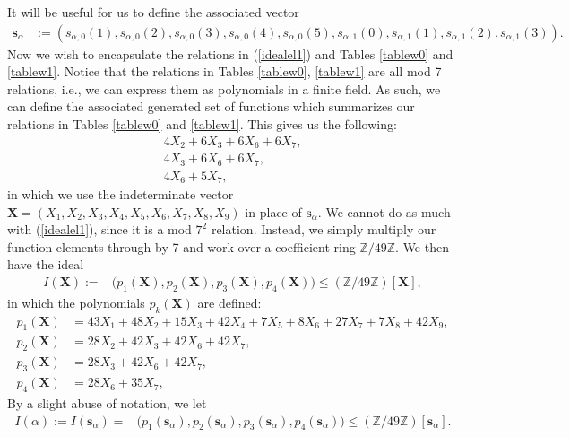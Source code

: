 \documentclass[reqno]{amsart}
\theoremstyle{definition}
\theoremstyle{remark}
\numberwithin{equation}{section}
\begin{document}
It will be useful for us to define the associated vector
\begin{align}
\mathbf{s}_{\alpha} &:= \left( s_{\alpha,0}(1), s_{\alpha,0}(2), s_{\alpha,0}(3), s_{\alpha,0}(4), s_{\alpha,0}(5), s_{\alpha,1}(0), s_{\alpha,1}(1), s_{\alpha,1}(2), s_{\alpha,1}(3) \right).\label{salphavector}
\end{align}  Now we wish to encapsulate the relations in (\ref{idealel1}) and Tables \ref{tablew0} and \ref{tablew1}.  Notice that the relations in Tables \ref{tablew0}, \ref{tablew1} are all mod 7 relations, i.e., we can express them as polynomials in a finite field.  As such, we can define the associated generated set of functions which summarizes our relations in Tables \ref{tablew0} and \ref{tablew1}.  This gives us the following:
\begin{align*}
4X_2 + 6X_3 + 6X_6 + 6X_7,\\
4X_3 + 6X_6 + 6X_7,\\
4X_6 + 5X_7,
\end{align*} in which we use the indeterminate vector $\mathbf{X} = \left( X_1, X_2, X_3, X_4, X_5, X_6, X_7, X_8, X_9 \right)$ in place of $\mathbf{s}_{\alpha}$.  We cannot do as much with (\ref{idealel1}), since it is a mod $7^2$ relation.  Instead, we simply multiply our function elements through by 7 and work over a coefficient ring $\mathbb{Z}/49\mathbb{Z}$.  We then have the ideal
\begin{align*}
I(\mathbf{X}) := &\big( p_1(\mathbf{X}), p_2(\mathbf{X}), p_3(\mathbf{X}), p_4(\mathbf{X}) \big) \le\left(\mathbb{Z}/49\mathbb{Z}\right)[\mathbf{X}],
\end{align*}  in which the polynomials $p_k(\mathbf{X})$ are defined:
\begin{align*}
p_1(\mathbf{X}) &= 43X_1 + 48X_2 + 15X_3 + 42X_4 + 7X_5 + 8X_6 + 27X_7 + 7X_8 + 42X_9,\\
p_2(\mathbf{X}) &= 28X_2 + 42X_3 + 42X_6 + 42X_7,\\
p_3(\mathbf{X}) &= 28X_3 + 42X_6 + 42X_7,\\
p_4(\mathbf{X}) &= 28X_6 + 35X_7,
\end{align*}  By a slight abuse of notation, we let
\begin{align}
I(\alpha) := I\left(\mathbf{s}_{\alpha}\right) = &\big( p_1(\mathbf{s}_{\alpha}), p_2(\mathbf{s}_{\alpha}), p_3(\mathbf{s}_{\alpha}), p_4(\mathbf{s}_{\alpha}) \big) \le\left(\mathbb{Z}/49\mathbb{Z}\right)[\mathbf{s}_{\alpha}].\label{congruenceidealdefn}
\end{align}  
\end{document}
